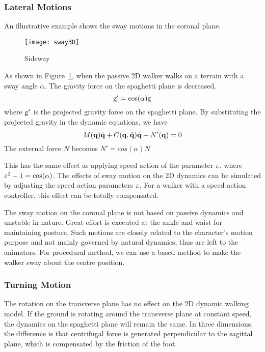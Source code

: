 \subsubsection*{Lateral Motions}
An illustrative example shows the sway motions in the coronal plane.

\begin{figure}[!htbp]
  \begin{center}
      \texttt{[image: sway3D]}
    \caption{Sideway}
    \label{fig:sidesway}
\end{center}
\end{figure}

As shown in Figure~\ref{fig:sidesway}, when the passive 2D walker walks on a terrain with a sway angle $\alpha$.
The gravity force on the spaghetti plane is decreased.
\[
\mathrm{g}'=\cos(\alpha)\mathrm{g}
\]
where $\mathrm{g}'$ is the projected gravity force on the spaghetti plane.
By substituting the projected gravity in the dynamic equations, we have
\begin{equation}
\label{eq:flyequation}
M(\mathbf{q}) \ddot{\mathbf{q}} + C(\mathbf{q,\dot{q}})\dot{\mathbf{q}} + N'(\mathbf{q}) = 0
\end{equation}
The external force $N$ becomes $N'=cos(\alpha)N$

This has the same effect as applying speed action of the parameter $\varepsilon$, where $\varepsilon^2-1=\cos(\alpha)$.
The effects of sway motion on the 2D dynamics can be simulated by adjusting the speed action parameters $\varepsilon$.
For a walker with a speed action controller, this effect can be totally compensated.

The sway motion on the coronal plane is not  based  on passive dynamics and unstable in nature\citep{kuo1999stabilization}.
Great effort is executed at the ankle and waist for maintaining posture.
Such motions are closely related to the character's motion purpose and not mainly governed by natural dynamics, thus are left to the animators.
For procedural method, we can use a \pd based method to make the walker sway about the centre position.


\subsubsection*{Turning Motion}
The rotation on the transverse plane has no effect on the 2D dynamic walking model.
If the ground is rotating around the transverse plane at constant speed, the dynamics on the spaghetti plane will remain the same.
In three dimensions, the difference is that centrifugal force is generated perpendicular to the sagittal plane, which is  compensated by the friction of the foot.

